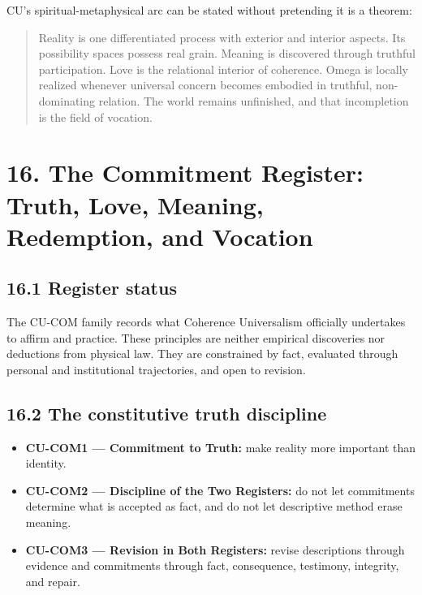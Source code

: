 \documentclass[
  11pt,
]{article}
\providecommand{\tightlist}{%
  \setlength{\itemsep}{0pt}\setlength{\parskip}{0pt}}
\begin{document}
CU's spiritual-metaphysical arc can be stated without pretending it is a
theorem:

\begin{quote}
Reality is one differentiated process with exterior and interior
aspects. Its possibility spaces possess real grain. Meaning is
discovered through truthful participation. Love is the relational
interior of coherence. Omega is locally realized whenever universal
concern becomes embodied in truthful, non-dominating relation. The world
remains unfinished, and that incompletion is the field of vocation.
\end{quote}

\section{16. The Commitment Register: Truth, Love, Meaning, Redemption,
and
Vocation}\label{the-commitment-register-truth-love-meaning-redemption-and-vocation}

\subsection{16.1 Register status}\label{register-status}

The CU-COM family records what Coherence Universalism officially
undertakes to affirm and practice. These principles are neither
empirical discoveries nor deductions from physical law. They are
constrained by fact, evaluated through personal and institutional
trajectories, and open to revision.

\subsection{16.2 The constitutive truth
discipline}\label{the-constitutive-truth-discipline}

\begin{itemize}
\tightlist
\item
  \textbf{CU-COM1 --- Commitment to Truth:} make reality more important
  than identity.
\item
  \textbf{CU-COM2 --- Discipline of the Two Registers:} do not let
  commitments determine what is accepted as fact, and do not let
  descriptive method erase meaning.
\item
  \textbf{CU-COM3 --- Revision in Both Registers:} revise descriptions
  through evidence and commitments through fact, consequence, testimony,
  integrity, and repair.
\end{itemize}
\end{document}
